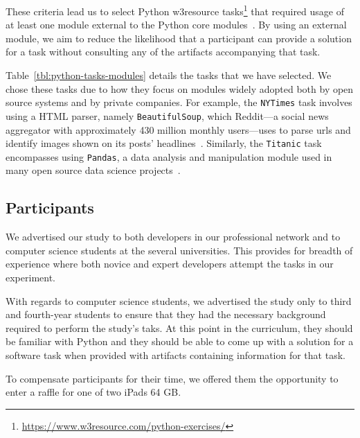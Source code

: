 {These criteria lead us to select Python w3resource tasks\footnote{\url{https://www.w3resource.com/python-exercises/}}
that required usage of at least one module external to the Python core modules~\cite{thiselton2019}.
By using an external module, we aim to reduce the likelihood that a participant 
can provide a solution for a task without consulting any of the artifacts accompanying that task. 






Table~\ref{tbl:python-tasks-modules} details the tasks that we have selected. 
We chose these tasks due to how they focus on modules widely adopted both by open source systems and by private companies.
For example, the \texttt{NYTimes} task involves using a HTML parser, namely \texttt{BeautifulSoup},
which Reddit---a social news aggregator with approximately 430 million monthly users---uses 
to parse urls and identify images shown on its posts' headlines~\cite{bs4-reddit}. 
Similarly, the \texttt{Titanic} task encompasses using \texttt{Pandas}, a data analysis and manipulation module
used in many open source data science projects~\cite{ma2017, shrestha2020}.










\subsection{Participants}



We advertised our study to both developers in our professional network and to computer science students at the several universities. 
This provides for breadth of experience where both novice and expert developers attempt the tasks in our experiment. 


With regards to computer science students, we advertised the study only to third and fourth-year students to ensure that they had the necessary background required to perform the study's taks.
At this point in the curriculum, they should be familiar with Python and they should be able to come up with a solution 
for a software task when provided with artifacts containing information for that task.


To compensate participants for their time, we offered them the opportunity to enter a raffle for one of two iPads 64 GB.




}
